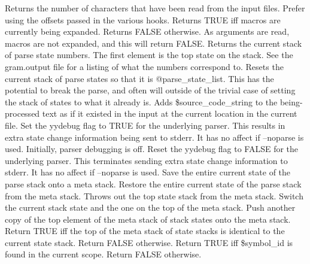  Returns the number of characters that have been read from the
 input files.  Prefer using the offsets passed in the various hooks.
 Returns TRUE iff macros are currently being expanded.
 Returns FALSE otherwise.  As arguments are read, macros are not expanded,
 and this will return FALSE.
 Returns the current stack of parse state numbers.  The first element is
 the top state on the stack.  See the gram.output
 file for a listing of what the numbers correspond to.
 Resets the current stack of parse states so that it is @parse\_\-state\_\-list.
 This has the potential to break the parse, and often will outside
 of the trivial case of setting the stack of states to what it already is.
 Adds \$source\_\-code\_\-string to the being-processed text 
 as if it existed in the input at the
 current location in the current file.
 Set the yydebug flag to TRUE for the underlying parser.
 This results in extra state change information being sent to stderr.
 It has no affect if --noparse is used.  Initially, parser debugging is off.
 Reset the yydebug flag to FALSE for the underlying parser.  
 This terminates sending extra state change information to stderr.
 It has no affect if --noparse is used.
 Save the entire current state of the parse stack onto a meta stack.
 Restore the entire current state of the parse stack from the meta stack.
 Throws out the top state stack from the meta stack.
 Switch the current stack state and the one on the top of the meta stack.
 Push another copy of the top element of the meta stack of stack states onto
 the meta stack.
 Return TRUE iff the top of the meta stack of state stacks is
 identical to the current state stack. Return FALSE otherwise.
 Return TRUE iff \$symbol\_\-id is found in the current scope.
 Return FALSE otherwise.

